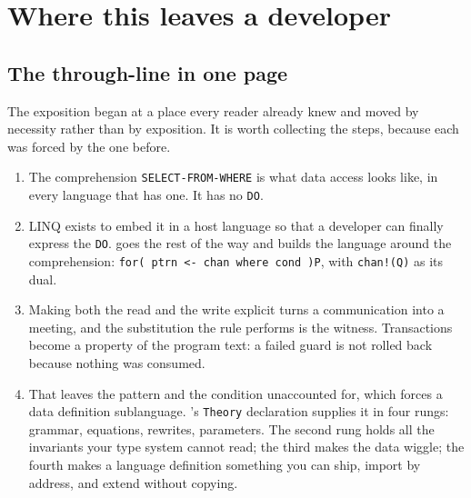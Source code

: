 \section{Where this leaves a developer}
\label{sec:close}

\subsection{The through-line in one page}

The exposition began at a place every reader already knew and moved by
necessity rather than by exposition. It is worth collecting the steps, because
each was forced by the one before.

\begin{enumerate}[leftmargin=1.8em,itemsep=3pt]
\item The comprehension \texttt{SELECT-FROM-WHERE} is what data access looks
  like, in every language that has one. It has no \texttt{DO}.
\item LINQ exists to embed it in a host language so that a developer can finally
  express the \texttt{DO}. \flang{} goes the rest of the way and builds the
  language around the comprehension:
  \texttt{for( ptrn <- chan where cond )P}, with \texttt{chan!(Q)} as its dual.
\item Making both the read and the write explicit turns a communication into a
  meeting, and the substitution the rule performs is the witness. Transactions
  become a property of the program text: a failed guard is not rolled back
  because nothing was consumed.
\item That leaves the pattern and the condition unaccounted for, which forces a
  data definition sublanguage. \flang{}'s \texttt{Theory} declaration supplies
  it in four rungs: grammar, equations, rewrites, parameters. The second rung
  holds all the invariants your type system cannot read; the third makes the
  data wiggle; the fourth makes a language definition something you can ship,
  import by address, and extend without copying.


\end{enumerate}
